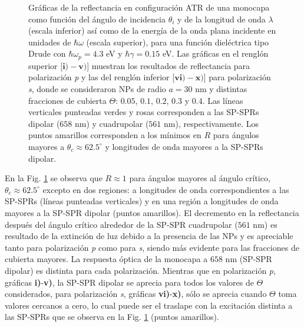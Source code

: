 \begin{figure}[h!]
\vspace*{-.5em}
	\caption{Gráficas de la reflectancia en configuración ATR de una monocapa como función del ángulo de incidencia $\theta_i$ y de la longitud de onda $\lambda$ (escala inferior) así como de la energía de la onda plana incidente en unidades de $\hbar\omega$ (escala superior), para una función dieléctrica tipo Drude con $\hbar\omega_p=4. 3$ eV  y  $\hbar\gamma=0. 15$ eV.  Las gráficas   en el renglón superior [$\mathbf{i)-v)}$]  muestran los resultados de reflectancia para  polarización \emph{p} y las del renglón inferior  [$\mathbf{vi)-x)}$] para polarización  \emph{s}, donde se consideraron NPs de radio $a=30$ nm y distintas fracciones de cubierta $\Theta$: $0. 05$, $0. 1$, $0. 2$, $0. 3$ y $0. 4$. Las líneas verticales punteadas verdes y rosas corresponden a las SP-SPRs dipolar ($658$ nm) y cuadrupolar ($561$ nm), respectivamente. Los puntos amarillos corresponden a los mínimos en $R$ para ángulos mayores a $\theta_c\approx 62.5^\circ$ y longitudes de onda mayores a la SP-SPRs dipolar.}	\label{fig:R-ATR4}	
	\end{figure}	

En la Fig.  \ref{fig:R-ATR4} se observa que $R\approx 1$ para ángulos mayores al ángulo crítico, $\theta_c \approx 62.5^\circ $ excepto en dos regiones: a longitudes de onda correspondientes a las SP-SPRs (líneas punteadas verticales) y en una región a longitudes de onda mayores a la SP-SPR dipolar (puntos amarillos). El decremento en la reflectancia después del ángulo crítico alrededor de la SP-SPR cuadrupolar ($561$ nm) es resultado de la extinción de luz debido a la presencia de las NPs y es apreciable tanto para polarización \emph{p} como para \emph{s}, siendo más evidente para las fracciones de cubierta mayores. La respuesta óptica de la monocapa a $658$ nm (SP-SPR dipolar) es distinta para cada polarización. Mientras que en polarización \emph{p}, gráficas \textbf{i)}-\textbf{v)}, la SP-SPR dipolar se aprecia para todos los valores de $\Theta$ considerados, para polarización \emph{s}, gráficas \textbf{vi)}-\textbf{x)},  sólo se aprecia cuando $\Theta$ toma valores cercanos a cero, lo cual puede ser el traslape con la excitación distinta a las SP-SPRs que se observa en la Fig. \ref{fig:R-ATR4} (puntos amarillos).

